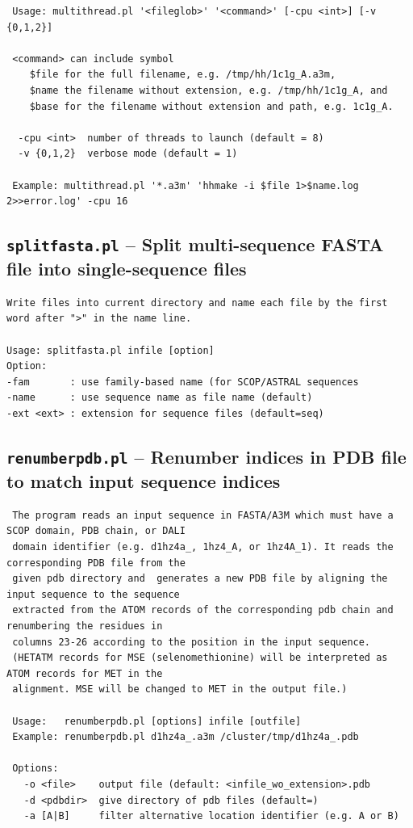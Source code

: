 \documentclass[11pt,a4paper]{article}
\begin{document}
\small 
\begin{verbatim}
 Usage: multithread.pl '<fileglob>' '<command>' [-cpu <int>] [-v {0,1,2}]

 <command> can include symbol 
    $file for the full filename, e.g. /tmp/hh/1c1g_A.a3m, 
    $name the filename without extension, e.g. /tmp/hh/1c1g_A, and 
    $base for the filename without extension and path, e.g. 1c1g_A.

  -cpu <int>  number of threads to launch (default = 8)
  -v {0,1,2}  verbose mode (default = 1)

 Example: multithread.pl '*.a3m' 'hhmake -i $file 1>$name.log 2>>error.log' -cpu 16
\end{verbatim} 
\normalsize

\subsection{{\tt splitfasta.pl} -- Split multi-sequence FASTA file into single-sequence files}
\small 
\begin{verbatim}
Write files into current directory and name each file by the first word after ">" in the name line. 

Usage: splitfasta.pl infile [option]
Option:
-fam       : use family-based name (for SCOP/ASTRAL sequences
-name      : use sequence name as file name (default)
-ext <ext> : extension for sequence files (default=seq)
\end{verbatim} 
\normalsize

\subsection{{\tt renumberpdb.pl} -- Renumber indices in PDB file to match input sequence indices}

\small 
\begin{verbatim}
 The program reads an input sequence in FASTA/A3M which must have a SCOP domain, PDB chain, or DALI 
 domain identifier (e.g. d1hz4a_, 1hz4_A, or 1hz4A_1). It reads the corresponding PDB file from the 
 given pdb directory and  generates a new PDB file by aligning the input sequence to the sequence 
 extracted from the ATOM records of the corresponding pdb chain and renumbering the residues in 
 columns 23-26 according to the position in the input sequence.
 (HETATM records for MSE (selenomethionine) will be interpreted as ATOM records for MET in the 
 alignment. MSE will be changed to MET in the output file.)
 
 Usage:   renumberpdb.pl [options] infile [outfile] 
 Example: renumberpdb.pl d1hz4a_.a3m /cluster/tmp/d1hz4a_.pdb 

 Options: 
   -o <file>    output file (default: <infile_wo_extension>.pdb
   -d <pdbdir>  give directory of pdb files (default=)
   -a [A|B]     filter alternative location identifier (e.g. A or B)
\end{verbatim} 
\normalsize
\end{document}
